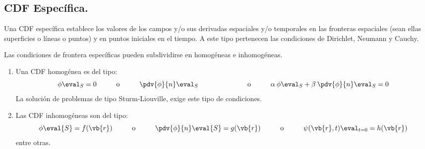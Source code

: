 \subsection*{CDF Específica.}
Una CDF específica establece los valores de los campos y/o sus derivadas espaciales y/o temporales en las fronteras espaciales (sean ellas superficies o líneas o puntos) y en puntos iniciales en el tiempo. A este tipo pertenecen las condiciones de Dirichlet, Neumann y Cauchy.
\par
Las condiciones de frontera específicas pueden subdividirse en homogéneas e inhomogéneas.
\begin{enumerate}
\item  Una CDF homogénea es del tipo:
\[ \phi \eval_{S} = 0 \hspace{1cm} \mbox{o} \hspace{1cm} \pdv{\phi}{n} \eval_{S} \hspace{1.5cm} \hspace{1cm} \mbox{o} \hspace{1cm} \alpha \: \phi \eval_{S} + \beta \: \pdv{\phi}{n} \eval_{S} = 0 \]
La solución de problemas de tipo Sturm-Liouville, exige este tipo de condiciones.
\item Las CDF inhomogéneas son del tipo:
\[ \phi \eval{S} = f(\vb{r}) \hspace{1cm} \mbox{o} \hspace{1cm}\pdv{\phi}{n} \eval{S} = g(\vb{r})\hspace{1cm} \mbox{o} \hspace{1cm} \psi(\vb{r}, t) \eval_{t=0} = h(\vb{r}) \]
entre otras.
\end{enumerate}
